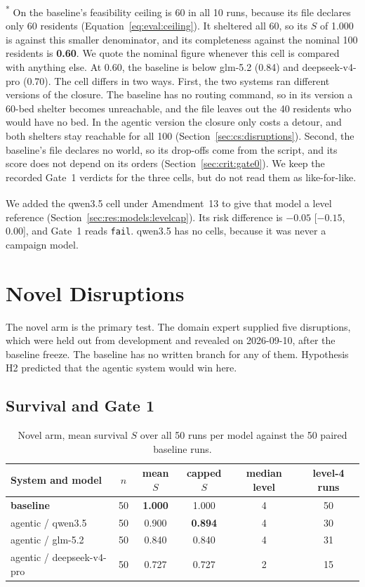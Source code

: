 \textsuperscript{*} On  the baseline's feasibility ceiling
is 60 in all 10 runs, because its file declares only 60 residents
(Equation~\ref{eq:eval:ceiling}). It sheltered all 60, so its $S$ of 1.000 is
against this smaller denominator, and its
completeness against the nominal 100 residents is \textbf{0.60}. We quote the
nominal figure whenever this cell is compared with anything else. At 0.60, the baseline is below glm-5.2 (0.84) and deepseek-v4-pro
(0.70). The cell differs in two ways. First, the two systems
ran different versions of the closure. The baseline has no routing
command, so in its version a 60-bed shelter becomes unreachable, and the file
leaves out the 40 residents who would have no bed. In the agentic
version the closure only costs a detour, and
both shelters stay reachable for all 100 (Section~\ref{sec:cs:disruptions}).
Second,
the baseline's file declares no world, so its drop-offs come from the script,
and its score does not depend on its orders
(Section~\ref{sec:crit:gate0}). We keep the recorded Gate~1 verdicts for the
three  cells, but do not read them as like-for-like.

\textsuperscript{\dag} We added the qwen3.5  cell under
Amendment~13 to give that model a level reference
(Section~\ref{sec:res:models:levelcap}). Its risk difference is $-0.05$
[$-0.15$, $0.00$], and Gate~1 reads \texttt{fail}. qwen3.5 has no
 cells, because it was never a campaign model.

\section{Novel Disruptions}
\label{sec:res:novel}

The novel arm is the primary test. The domain expert supplied five
disruptions, which were held out from development and revealed on 2026-09-10,
after the baseline freeze. The
baseline has no written branch for any of them. Hypothesis H2 predicted that
the agentic system would win here.

\subsection{Survival and Gate 1}
\label{sec:res:novel:survival}
\label{sec:res:novel:gate1}

\begin{table}[htbp]
\centering
\caption{Novel arm, mean survival $S$ over all 50 runs per model against the
50 paired baseline runs.}
\label{tab:res:novelmeans}
\begin{tabular}{lccccc}
\toprule
System and model & $n$ & mean $S$ & capped $S$ & median level & level-4 runs \\
\midrule
\textbf{baseline} & 50 & \textbf{1.000} & 1.000 & 4 & 50 \\
agentic / qwen3.5 & 50 & 0.900 & \textbf{0.894} & 4 & 30 \\
agentic / glm-5.2 & 50 & 0.840 & 0.840 & 4 & 31 \\
agentic / deepseek-v4-pro & 50 & 0.727 & 0.727 & 2 & 15 \\
\bottomrule
\end{tabular}
\end{table}

